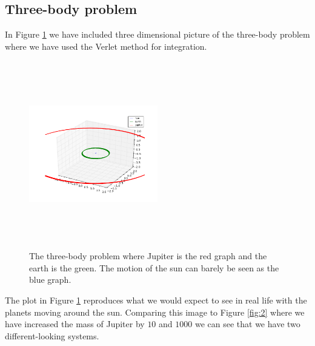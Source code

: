 \documentclass[%
 reprint,
 nobalance,
 amsmath,amssymb,
 aps,
]{revtex4-1}
\begin{document}
\subsection{\label{sec:Sub2}Three-body problem}

In Figure \ref{fig:plot/earth_sun_jupiter_mj1.png} we have included three dimensional picture of the three-body problem where we have used the Verlet method for integration.

\begin{figure}[H]
\centering
\includegraphics[height=3.2in, width=0.5\textwidth]{plot/earth_sun_jupiter_mj1.png} \caption{The three-body problem where Jupiter is the red graph and the earth is the green. The motion of the sun can barely be seen as the blue graph.}\label{fig:plot/earth_sun_jupiter_mj1.png}
\end{figure}

The plot in Figure \ref{fig:plot/earth_sun_jupiter_mj1.png} reproduces what we would expect to see in real life with the planets moving around the sun. Comparing this image to Figure \ref{fig:2} where we have increased the mass of Jupiter by $10$ and $1000$ we can see that we have two different-looking systems.
\end{document}
